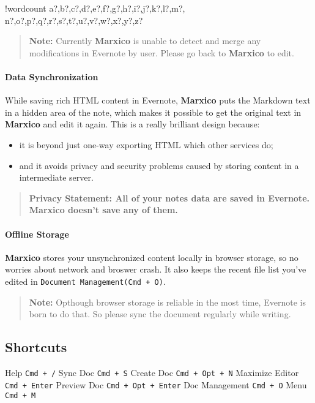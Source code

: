 \documentclass{article}
\providecommand{\tightlist}{%
  \setlength{\itemsep}{0pt}\setlength{\parskip}{0pt}}
\let\oldparagraph\paragraph
\renewcommand{\paragraph}[1]{\oldparagraph{#1}\mbox{}}
\newcounter{words}
\newenvironment{counted}{%
  \setcounter{words}{0}
  \SearchList!{wordcount}{\stepcounter{words}}
    {a?,b?,c?,d?,e?,f?,g?,h?,i?,j?,k?,l?,m?,
    n?,o?,p?,q?,r?,s?,t?,u?,v?,w?,x?,y?,z?}
  \UndoBoundary{'}
  \SearchOrder{p;}}{%
  \StopSearching}
\begin{document}
\begin{counted}
\begin{quote}
\textbf{Note:} Currently \textbf{Marxico} is unable to detect and merge
any modifications in Evernote by user. Please go back to
\textbf{Marxico} to edit.
\end{quote}

\paragraph{Data Synchronization}\label{data-synchronization}

While saving rich HTML content in Evernote, \textbf{Marxico} puts the
Markdown text in a hidden area of the note, which makes it possible to
get the original text in \textbf{Marxico} and edit it again. This is a
really brilliant design because:

\begin{itemize}
\tightlist
\item
  it is beyond just one-way exporting HTML which other services do;
\item
  and it avoids privacy and security problems caused by storing content
  in a intermediate server.
\end{itemize}

\begin{quote}
\textbf{Privacy Statement: All of your notes data are saved in Evernote.
Marxico doesn't save any of them.}
\end{quote}

\paragraph{Offline Storage}\label{offline-storage}

\textbf{Marxico} stores your unsynchronized content locally in browser
storage, so no worries about network and broswer crash. It also keeps
the recent file list you've edited in
\texttt{Document\ Management(Cmd\ +\ O)}.

\begin{quote}
\textbf{Note:} Opthough browser storage is reliable in the most time,
Evernote is born to do that. So please sync the document regularly while
writing.
\end{quote}

\subsection{Shortcuts}\label{shortcuts}

Help \texttt{Cmd\ +\ /} Sync Doc \texttt{Cmd\ +\ S} Create Doc
\texttt{Cmd\ +\ Opt\ +\ N} Maximize Editor \texttt{Cmd\ +\ Enter}
Preview Doc \texttt{Cmd\ +\ Opt\ +\ Enter} Doc Management
\texttt{Cmd\ +\ O} Menu \texttt{Cmd\ +\ M}


\end{counted}
\end{document}
